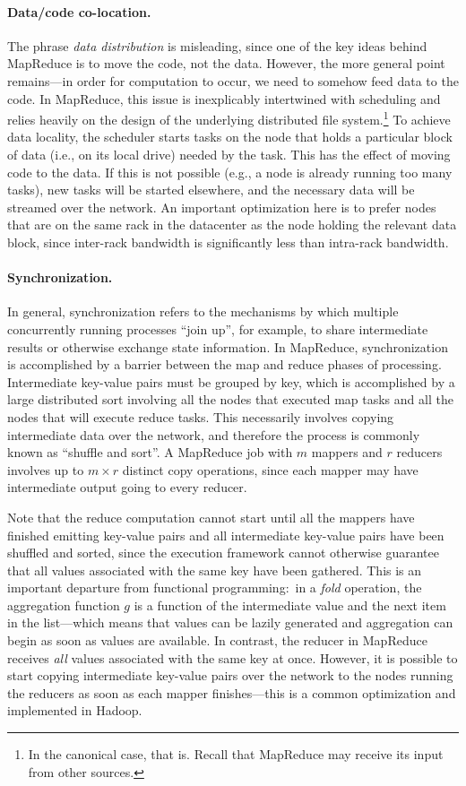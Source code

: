 \paragraph{Data/code co-location.}  The phrase \emph{data
  distribution} is misleading, since one of the key ideas behind
MapReduce is to move the code, not the data.  However, the more
general point remains---in order for computation to occur, we need to
somehow feed data to the code.  In MapReduce, this issue is
inexplicably intertwined with scheduling and relies heavily on the
design of the underlying distributed file system.\footnote{In the
canonical case, that is.  Recall that MapReduce may receive its input
from other sources.} To achieve data locality, the scheduler starts
tasks on the node that holds a particular block of data (i.e., on its
local drive) needed by the task.  This has the effect of moving code
to the data.  If this is not possible (e.g., a node is already running
too many tasks), new tasks will be started elsewhere, and the
necessary data will be streamed over the network.  An important
optimization here is to prefer nodes that are on the same rack in the
datacenter as the node holding the relevant data block, since
inter-rack bandwidth is significantly less than intra-rack bandwidth.

\paragraph{Synchronization.} In general, synchronization refers to
the mechanisms by which multiple concurrently running processes ``join
up'', for example, to share intermediate results or otherwise exchange
state information.  In MapReduce, synchronization is accomplished by a
barrier between the map and reduce phases of processing.  Intermediate
key-value pairs must be grouped by key, which is accomplished by a
large distributed sort involving all the nodes that executed map tasks
and all the nodes that will execute reduce tasks.  This necessarily
involves copying intermediate data over the network, and therefore the
process is commonly known as ``shuffle and sort''.  A MapReduce job
with $m$ mappers and $r$ reducers involves up to $m \times r$ distinct
copy operations, since each mapper may have intermediate output going
to every reducer.

Note that the reduce computation cannot start until all the mappers
have finished emitting key-value pairs and all intermediate key-value
pairs have been shuffled and sorted, since the execution framework
cannot otherwise guarantee that all values associated with the same
key have been gathered.  This is an important departure from
functional programming:\ in a \emph{fold} operation, the aggregation
function $g$ is a function of the intermediate value and the next item
in the list---which means that values can be lazily generated and
aggregation can begin as soon as values are available.  In contrast,
the reducer in MapReduce receives \emph{all} values associated with the
same key at once.  However, it is possible to start copying
intermediate key-value pairs over the network to the nodes running the
reducers as soon as each mapper finishes---this is a common
optimization and implemented in Hadoop.

